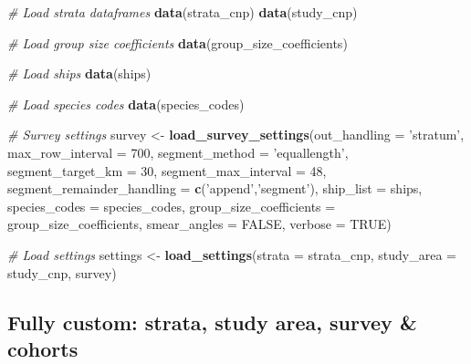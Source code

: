 \documentclass[
]{book}
\newenvironment{Shaded}{\begin{snugshade}}{\end{snugshade}}
\newcommand{\CommentTok}[1]{\textcolor[rgb]{0.56,0.35,0.01}{\textit{#1}}}
\newcommand{\DataTypeTok}[1]{\textcolor[rgb]{0.13,0.29,0.53}{#1}}
\newcommand{\DecValTok}[1]{\textcolor[rgb]{0.00,0.00,0.81}{#1}}
\newcommand{\KeywordTok}[1]{\textcolor[rgb]{0.13,0.29,0.53}{\textbf{#1}}}
\newcommand{\NormalTok}[1]{#1}
\newcommand{\OtherTok}[1]{\textcolor[rgb]{0.56,0.35,0.01}{#1}}
\newcommand{\StringTok}[1]{\textcolor[rgb]{0.31,0.60,0.02}{#1}}
\begin{document}
\begin{Shaded}
\begin{Highlighting}[]
\CommentTok{# Load strata dataframes}
\KeywordTok{data}\NormalTok{(strata_cnp)}
\KeywordTok{data}\NormalTok{(study_cnp)}

\CommentTok{# Load group size coefficients}
\KeywordTok{data}\NormalTok{(group_size_coefficients)}

\CommentTok{# Load ships}
\KeywordTok{data}\NormalTok{(ships)}

\CommentTok{# Load species codes}
\KeywordTok{data}\NormalTok{(species_codes)}

\CommentTok{# Survey settings}
\NormalTok{survey <-}\StringTok{ }
\StringTok{  }\KeywordTok{load_survey_settings}\NormalTok{(}\DataTypeTok{out_handling =} \StringTok{'stratum'}\NormalTok{,}
                       \DataTypeTok{max_row_interval =} \DecValTok{700}\NormalTok{,}
                       \DataTypeTok{segment_method =} \StringTok{'equallength'}\NormalTok{,}
                       \DataTypeTok{segment_target_km =} \DecValTok{30}\NormalTok{,}
                       \DataTypeTok{segment_max_interval =} \DecValTok{48}\NormalTok{,}
                       \DataTypeTok{segment_remainder_handling =} \KeywordTok{c}\NormalTok{(}\StringTok{'append'}\NormalTok{,}\StringTok{'segment'}\NormalTok{),}
                       \DataTypeTok{ship_list =}\NormalTok{ ships,}
                       \DataTypeTok{species_codes =}\NormalTok{ species_codes,}
                       \DataTypeTok{group_size_coefficients =}\NormalTok{ group_size_coefficients,}
                       \DataTypeTok{smear_angles =} \OtherTok{FALSE}\NormalTok{,}
                       \DataTypeTok{verbose =} \OtherTok{TRUE}\NormalTok{)}

\CommentTok{# Load settings}
\NormalTok{settings <-}\StringTok{ }\KeywordTok{load_settings}\NormalTok{(}\DataTypeTok{strata =}\NormalTok{ strata_cnp,}
                          \DataTypeTok{study_area =}\NormalTok{ study_cnp,}
\NormalTok{                          survey)}
\end{Highlighting}
\end{Shaded}

\hypertarget{fully-custom-strata-study-area-survey-cohorts}{%
\subsection*{Fully custom: strata, study area, survey \& cohorts}\label{fully-custom-strata-study-area-survey-cohorts}}
\end{document}
